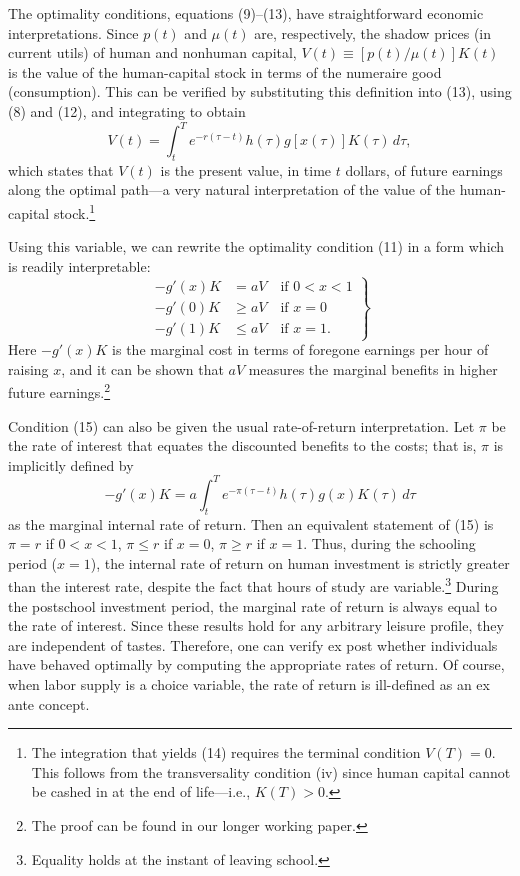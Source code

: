 \documentclass[11pt,fleqn]{article}
\begin{document}
The optimality conditions, equations (9)--(13), have straightforward economic interpretations. Since $p(t)$ and $\mu(t)$ are, respectively, the shadow prices (in current utils) of human and nonhuman capital, $V(t) \equiv [p(t)/\mu(t)]K(t)$ is the value of the human-capital stock in terms of the numeraire good (consumption). This can be verified by substituting this definition into (13), using (8) and (12), and integrating to obtain
\begin{equation}
V(t) = \int_{t}^{T} e^{-r(\tau - t)} h(\tau) g[x(\tau)] K(\tau) \, d\tau,
\end{equation}
which states that $V(t)$ is the present value, in time $t$ dollars, of future earnings along the optimal path---a very natural interpretation of the value of the human-capital stock.\footnote{The integration that yields (14) requires the terminal condition $V(T) = 0$. This follows from the transversality condition (iv) since human capital cannot be cashed in at the end of life---i.e., $K(T) > 0$.}

Using this variable, we can rewrite the optimality condition (11) in a form which is readily interpretable:
\begin{equation}
\left.
\begin{aligned}
-g'(x)K &= aV \quad \text{if } 0 < x < 1 \\
-g'(0)K &\geq aV \quad \text{if } x = 0 \\
-g'(1)K &\leq aV \quad \text{if } x = 1.
\end{aligned}
\right\}
\end{equation}
Here $-g'(x)K$ is the marginal cost in terms of foregone earnings per hour of raising $x$, and it can be shown that $aV$ measures the marginal benefits in higher future earnings.\footnote{The proof can be found in our longer working paper.}

Condition (15) can also be given the usual rate-of-return interpretation. Let $\pi$ be the rate of interest that equates the discounted benefits to the costs; that is, $\pi$ is implicitly defined by
\[
-g'(x)K = a \int_{t}^{T} e^{-\pi(\tau - t)} h(\tau) g(x) K(\tau) \, d\tau
\]
as the marginal internal rate of return. Then an equivalent statement of (15) is $\pi = r$ if $0 < x < 1$, $\pi \leq r$ if $x = 0$, $\pi \geq r$ if $x = 1$. Thus, during the schooling period ($x = 1$), the internal rate of return on human investment is strictly greater than the interest rate, despite the fact that hours of study are variable.\footnote{Equality holds at the instant of leaving school.} During the postschool investment period, the marginal rate of return is always equal to the rate of interest. Since these results hold for any arbitrary leisure profile, they are independent of tastes. Therefore, one can verify ex post whether individuals have behaved optimally by computing the appropriate rates of return. Of course, when labor supply is a choice variable, the rate of return is ill-defined as an ex ante concept.
\end{document}
